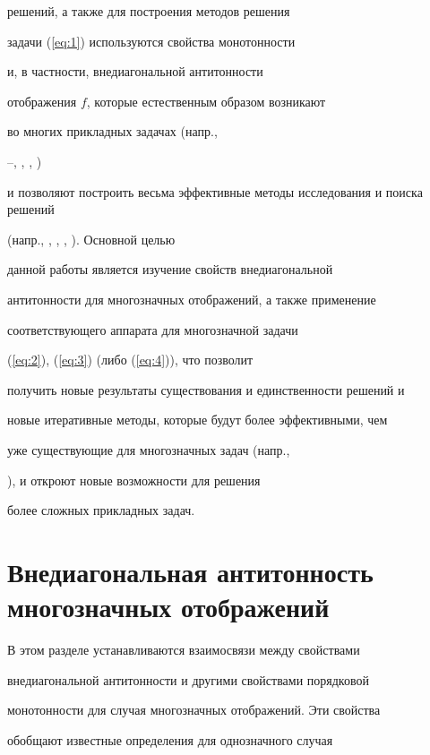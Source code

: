 решений, а также для построения методов решения


задачи (\ref{eq:1}) используются свойства монотонности


и, в частности, внедиагональной антитонности


отображения $f$, которые естественным образом возникают


во многих прикладных задачах (напр.,


\cite{Mal72}--\cite{Opo86}, \cite{CPS92}, \cite{Isa92}, \cite{Ers02})


и позволяют построить весьма эффективные методы исследования и поиска решений


(напр., \cite{CPS92}, \cite{Isa92}, \cite{Mor74}, \cite{Tam74}). Основной целью


данной работы является изучение свойств внедиагональной


антитонности для многозначных отображений, а также применение


соответствующего аппарата для многозначной задачи


(\ref{eq:2}), (\ref{eq:3}) (либо (\ref{eq:4})), что позволит


получить новые результаты существования и единственности решений и


новые итеративные методы, которые будут более эффективными, чем


уже существующие для многозначных задач (напр.,


\cite{Kon98}), и откроют новые возможности для решения 


более сложных прикладных задач.











\section{Внедиагональная антитонность многозначных отображений}





В этом разделе устанавливаются взаимосвязи между свойствами


внедиагональной антитонности и другими свойствами порядковой


монотонности для случая многозначных отображений. Эти свойства


обобщают известные определения для однозначного случая


